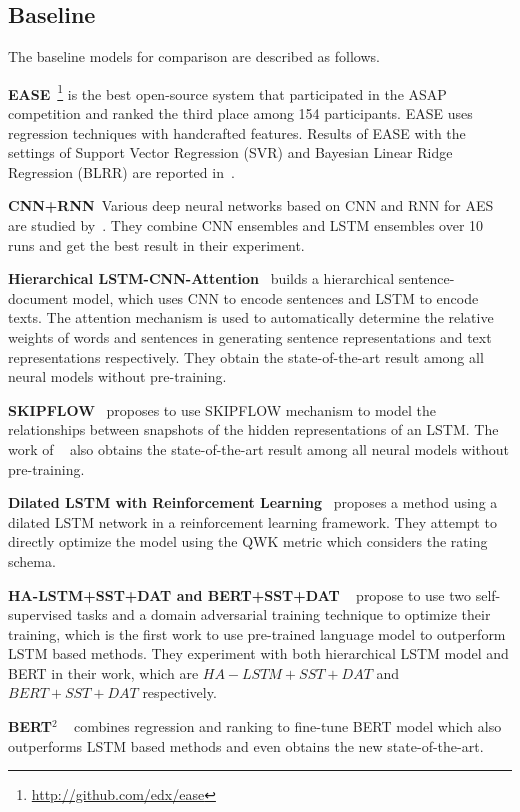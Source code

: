 \documentclass[11pt]{article}
\begin{document}
\subsection{Baseline}
The baseline models for comparison are described as follows.






\textbf{EASE}~\footnote{\url{http://github.com/edx/ease}} is the best open-source system that participated in the ASAP competition and ranked the third place among 154 participants.
EASE uses regression techniques with handcrafted features.
Results of EASE with the settings of Support Vector Regression (SVR) and Bayesian Linear Ridge Regression (BLRR) are reported in~\citep{Phandi:2015}.

\textbf{CNN+RNN}~Various deep neural networks based on CNN and RNN for AES are studied by~\citep{Taghipour:2016}.
They combine CNN ensembles and LSTM ensembles over 10 runs and get the best result in their experiment.

\textbf{Hierarchical LSTM-CNN-Attention}~\citep{Dong:2017} builds a hierarchical sentence-document model, which uses CNN to encode sentences and LSTM to encode texts.
The attention mechanism is used to automatically determine the relative weights of words and sentences in generating sentence representations and text representations respectively. They obtain the state-of-the-art result among all neural models without pre-training. 

\textbf{SKIPFLOW}~\citep{Tay:2018} proposes to use SKIPFLOW mechanism to model the relationships between snapshots of the hidden representations of an LSTM.
The work of ~\citep{Tay:2018} also obtains the state-of-the-art result among all neural models without pre-training. 

\textbf{Dilated LSTM with Reinforcement Learning}~\citep{Wang:2018} proposes a method using a dilated LSTM network in a reinforcement learning framework.
They attempt to directly optimize the model using the QWK metric which considers the rating schema.

\textbf{HA-LSTM+SST+DAT and BERT+SST+DAT} ~\citep{Cao:2020} propose to use two self-supervised tasks and a domain adversarial training technique to optimize their training, which is the first work to use pre-trained language model to outperform LSTM based methods. They experiment with both hierarchical LSTM model and BERT in their work, which are $HA-LSTM+SST+DAT$ and $BERT+SST+DAT$ respectively.

\textbf{BERT$^2$} ~\citep{Yang:2020} combines regression and ranking to fine-tune BERT model which also outperforms LSTM based methods and even obtains the new state-of-the-art.
\end{document}
